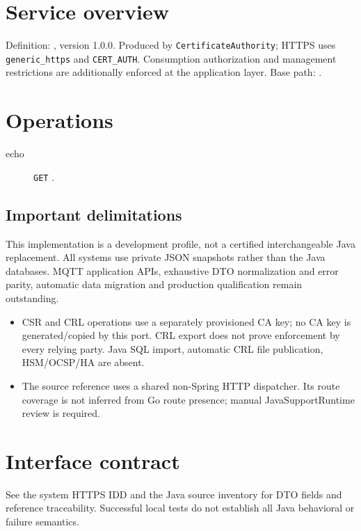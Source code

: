 \documentclass[a4paper]{arrowhead}
\begin{document}
\ArrowheadSetup
\section{Service overview}
Definition: , version 1.0.0. Produced by \texttt{CertificateAuthority}; HTTPS uses \texttt{generic\_https} and \texttt{CERT\_AUTH}. Consumption authorization and management restrictions are additionally enforced at the application layer. Base path: .
\section{Operations}
\begin{description}
\item[echo] \texttt{GET} .
\end{description}
\subsection{Important delimitations}
This implementation is a development profile, not a certified interchangeable Java replacement. All systems use private JSON snapshots rather than the Java databases. MQTT application APIs, exhaustive DTO normalization and error parity, automatic data migration and production qualification remain outstanding.
\begin{itemize}
\item CSR and CRL operations use a separately provisioned CA key; no CA key is generated/copied by this port. CRL export does not prove enforcement by every relying party. Java SQL import, automatic CRL file publication, HSM/OCSP/HA are absent.
\item The source reference uses a shared non-Spring HTTP dispatcher. Its route coverage is not inferred from Go route presence; manual JavaSupportRuntime review is required.
\end{itemize}
\section{Interface contract}
See the system HTTPS IDD and the Java source inventory for DTO fields and reference traceability. Successful local tests do not establish all Java behavioral or failure semantics.
\end{document}
